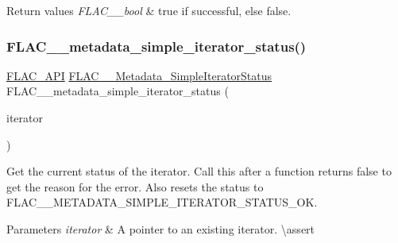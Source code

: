 \begin{DoxyRetVals}{Return values}
{\em F\+L\+A\+C\+\_\+\+\_\+bool} & {\ttfamily true} if successful, else {\ttfamily false}. \\
\hline
\end{DoxyRetVals}
\mbox{\label{group__flac__metadata__level1_ga68cfafa2323154f3ee1d3061eafe109f}} 
\subsubsection{\texorpdfstring{FLAC\_\_metadata\_simple\_iterator\_status()}{FLAC\_\_metadata\_simple\_iterator\_status()}}
{\footnotesize\ttfamily \mbox{\hyperlink{group__flac__export_ga56ca07df8a23310707732b1c0007d6f5}{F\+L\+A\+C\+\_\+\+A\+PI}} \mbox{\hyperlink{group__flac__metadata__level1_gac926e7d2773a05066115cac9048bbec9}{F\+L\+A\+C\+\_\+\+\_\+\+Metadata\+\_\+\+Simple\+Iterator\+Status}} F\+L\+A\+C\+\_\+\+\_\+metadata\+\_\+simple\+\_\+iterator\+\_\+status (\begin{DoxyParamCaption}\item[{\mbox{\hyperlink{group__flac__metadata__level1_ga6accccddbb867dfc2eece9ee3ffecb3a}{F\+L\+A\+C\+\_\+\+\_\+\+Metadata\+\_\+\+Simple\+Iterator}} $\ast$}]{iterator }\end{DoxyParamCaption})}

Get the current status of the iterator. Call this after a function returns {\ttfamily false} to get the reason for the error. Also resets the status to F\+L\+A\+C\+\_\+\+\_\+\+M\+E\+T\+A\+D\+A\+T\+A\+\_\+\+S\+I\+M\+P\+L\+E\+\_\+\+I\+T\+E\+R\+A\+T\+O\+R\+\_\+\+S\+T\+A\+T\+U\+S\+\_\+\+OK.


\begin{DoxyParams}{Parameters}
{\em iterator} & A pointer to an existing iterator. \textbackslash{}assert 
\begin{DoxyCode}{1}
\end{DoxyCode}
 \\
\hline
\end{DoxyParams}

